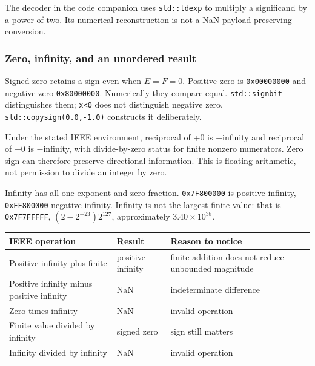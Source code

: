 The decoder in the code companion uses \texttt{std::ldexp} to multiply a significand by a power of two. Its numerical reconstruction is not a NaN-payload-preserving conversion.

\subsubsection{Zero, infinity, and an unordered result}\label{01-foundations-i-ch001-zero-infinity-and-an-unordered-result}

\hypertarget{01-foundations-i-ch001-zero-infinity-and-an-unordered-result}{}

\hyperref[appendix-3a048f032c1f]{Signed zero} retains a sign even when \(E=F=0\). Positive zero is \texttt{0x00000000} and negative zero \texttt{0x80000000}. Numerically they compare equal. \texttt{std::signbit} distinguishes them; \texttt{x\textless{}0} does not distinguish negative zero. \texttt{std::copysign(0.0,-1.0)} constructs it deliberately.

Under the stated IEEE environment, reciprocal of +0 is +infinity and reciprocal of −0 is −infinity, with divide-by-zero status for finite nonzero numerators. Zero sign can therefore preserve directional information. This is floating arithmetic, not permission to divide an integer by zero.

\hyperref[appendix-eb336149c00a]{Infinity} has all-one exponent and zero fraction. \texttt{0x7F800000} is positive infinity, \texttt{0xFF800000} negative infinity. Infinity is not the largest finite value: that is \texttt{0x7F7FFFFF}, \((2-2^{-23})2^{127}\), approximately \(3.40\times10^{38}\).

{\def\LTcaptype{none} %
\begin{longtable}[]{@{}
  >{\raggedright\arraybackslash}p{}
  >{\raggedright\arraybackslash}p{}
  >{\raggedright\arraybackslash}p{}@{}}
\toprule\noalign{}
\begin{minipage}[b]{\linewidth}\raggedright
IEEE operation
\end{minipage} & \begin{minipage}[b]{\linewidth}\raggedright
Result
\end{minipage} & \begin{minipage}[b]{\linewidth}\raggedright
Reason to notice
\end{minipage} \\
\midrule\noalign{}
\endhead
\bottomrule\noalign{}
\endlastfoot
Positive infinity plus finite & positive infinity & finite addition does not reduce unbounded magnitude \\
Positive infinity minus positive infinity & NaN & indeterminate difference \\
Zero times infinity & NaN & invalid operation \\
Finite value divided by infinity & signed zero & sign still matters \\
Infinity divided by infinity & NaN & invalid operation \\
\end{longtable}
}

